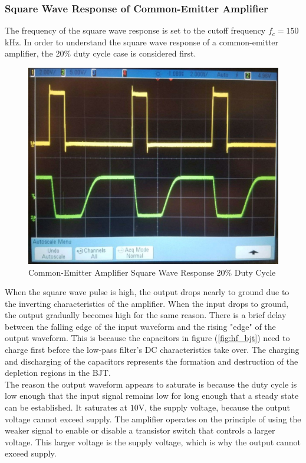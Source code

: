 \subsubsection{Square Wave Response of Common-Emitter Amplifier}
The frequency of the square wave response is set to the cutoff frequency $f_c = 150$\si{\kilo\hertz}. In order to understand the square wave response of a common-emitter amplifier, the 20\% duty cycle case is considered first.
\FloatBarrier
\begin{figure}[h!]
	\centering
	\includegraphics[scale=0.25]{./images/amplifier_20_duty_cycle.jpeg}
	\caption{Common-Emitter Amplifier Square Wave Response 20\% Duty Cycle}
	\label{fig:twenty_perc_duty_cycle}
\end{figure}
\FloatBarrier
When the square wave pulse is high, the output drops nearly to ground due to the inverting characteristics of the amplifier. When the input drops to ground, the output gradually becomes high for the same reason. There is a brief delay between the falling edge of the input waveform and the rising "edge" of the output waveform. This is because the capacitors in figure (\ref{fig:hf_bjt}) need to charge first before the low-pass filter's DC characteristics take over. The charging and discharging of the capacitors represents the formation and destruction of the depletion regions in the BJT. \\
The reason the output waveform appears to saturate is because the duty cycle is low enough that the input signal remains low for long enough that a steady state can be established. It saturates at $10$\si{\volt}, the supply voltage, because the output voltage cannot exceed supply. The amplifier operates on the principle of using the weaker signal to enable or disable a transistor switch that controls a larger voltage. This larger voltage is the supply voltage, which is why the output cannot exceed supply. \\
